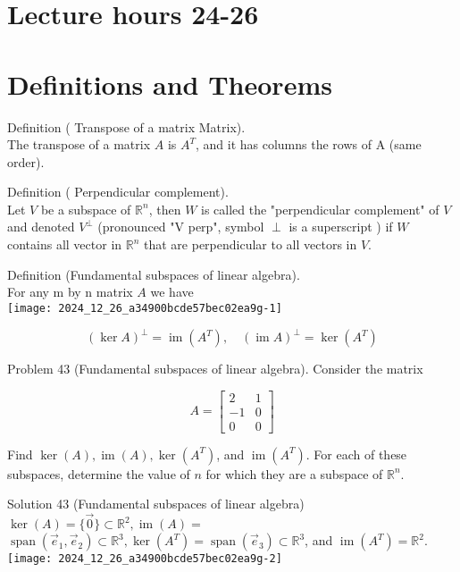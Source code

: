 \documentclass[10pt]{article}
\begin{document}
\section*{Lecture hours 24-26}
\section*{Definitions and Theorems}
Definition ( Transpose of a matrix Matrix).\\
The transpose of a matrix $A$ is $A^{T}$, and it has columns the rows of A (same order).

Definition ( Perpendicular complement).\\
Let $V$ be a subspace of $\mathbb{R}^{n}$, then $W$ is called the "perpendicular complement" of $V$ and denoted $V^{\perp}$ (pronounced "V perp", symbol $\perp$ is a superscript ) if $W$ contains all vector in $\mathbb{R}^{n}$ that are perpendicular to all vectors in $V$.

Definition (Fundamental subspaces of linear algebra).\\
For any m by n matrix $A$ we have\\
\texttt{[image: 2024\_12\_26\_a34900bcde57bec02ea9g-1]}

$$
(\operatorname{ker} A)^{\perp}=\operatorname{im}\left(A^{T}\right), \quad(\operatorname{im} A)^{\perp}=\operatorname{ker}\left(A^{T}\right)
$$

Problem 43 (Fundamental subspaces of linear algebra). Consider the matrix

$$
A=\left[\begin{array}{cc}
2 & 1 \\
-1 & 0 \\
0 & 0
\end{array}\right]
$$

Find $\operatorname{ker}(A), \operatorname{im}(A), \operatorname{ker}\left(A^{T}\right)$, and $\operatorname{im}\left(A^{T}\right)$. For each of these subspaces, determine the value of $n$ for which they are a subspace of $\mathbb{R}^{n}$.

Solution 43 (Fundamental subspaces of linear algebra) $\operatorname{ker}(A)=\{\overrightarrow{0}\} \subset \mathbb{R}^{2}, \operatorname{im}(A)=$ $\operatorname{span}\left(\vec{e}_{1}, \vec{e}_{2}\right) \subset \mathbb{R}^{3}, \operatorname{ker}\left(A^{T}\right)=\operatorname{span}\left(\vec{e}_{3}\right) \subset \mathbb{R}^{3}$, and $\operatorname{im}\left(A^{T}\right)=\mathbb{R}^{2}$.\\
\texttt{[image: 2024\_12\_26\_a34900bcde57bec02ea9g-2]}
\end{document}
